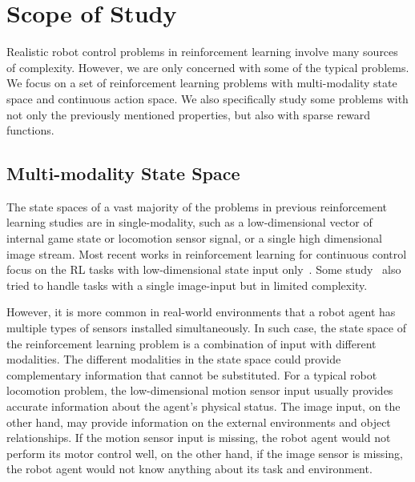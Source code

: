 


\section{Scope of Study}
Realistic robot control problems in reinforcement learning involve many sources of complexity. However, we are only concerned with some of the typical problems.
We focus on a set of reinforcement learning problems with multi-modality state space and continuous action space. We also specifically study some problems with not only the previously mentioned properties, but also with sparse reward functions.

\subsection{Multi-modality State Space}

The state spaces of a vast majority of the problems in previous reinforcement learning studies are in single-modality, such as a low-dimensional vector of internal game state or locomotion sensor signal, or a single high dimensional image stream. Most recent works in reinforcement learning for continuous control focus on the RL tasks with low-dimensional state input only~\cite{duan2016benchmarking}. Some study~\cite{wu2017scalable} also tried to handle tasks with a single image-input but in limited complexity.

However, it is more common in real-world environments that a robot agent has multiple types of sensors installed simultaneously. In such case, the state space of the reinforcement learning problem is a combination of input with different modalities. The different modalities in the state space could provide complementary information that cannot be substituted. For a typical robot locomotion problem, the low-dimensional motion sensor input usually provides accurate information about the agent's physical status. The image input, on the other hand, may provide information on the external environments and object relationships. If the motion sensor input is missing, the robot agent would not perform its motor control well, on the other hand, if the image sensor is missing, the robot agent would not know anything about its task and environment.


